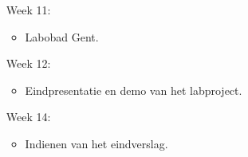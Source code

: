 \begin{itemize}
				\item[Week 11:]
					\begin{itemize}
						\item Labobad Gent.
					\end{itemize}					

				\item[Week 12:]
					\begin{itemize}
						\item Eindpresentatie en demo van het labproject.
					\end{itemize}								

				\item[Week 14:]
					\begin{itemize}
						\item Indienen van het eindverslag.
					\end{itemize}

			\end{itemize}